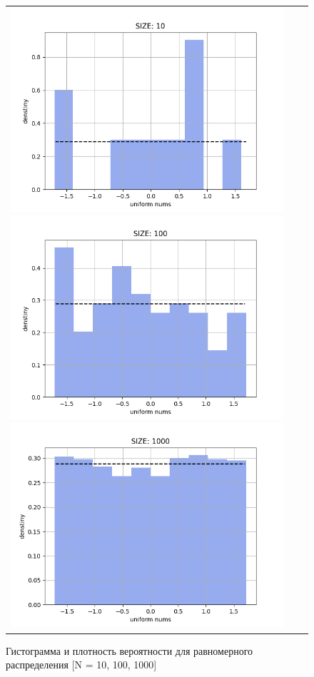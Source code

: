 \begin{itemize}
	\begin{figure}[H]
		\begin{tabular}{ccc}
			\includegraphics[scale=0.333]{task_1/resource/uniform10.png}
			\includegraphics[scale=0.333]{task_1/resource/uniform100.png}
			\includegraphics[scale=0.333]{task_1/resource/uniform1000.png}
		\end{tabular}
		\caption{Гистограмма и плотность вероятности для равномерного распределения [N = 10, 100, 1000]} 
	\end{figure}

\end{itemize}